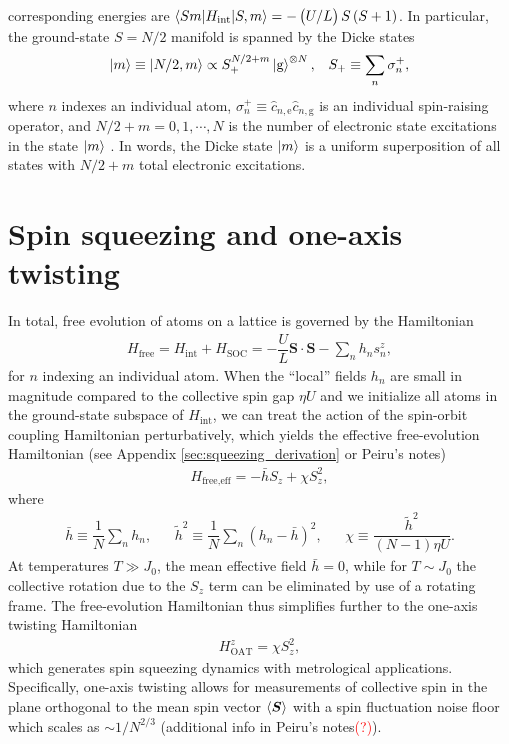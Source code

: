 \documentclass[aps,notitlepage,nofootinbib,11pt]{revtex4-1}
\renewcommand{\t}{\text} %
\newcommand{\f}[2]{\dfrac{#1}{#2}} %
\newcommand{\p}[1]{\left(#1\right)} %
\renewcommand{\v}{\bm} %
\renewcommand{\c}{\cdot} %
\newcommand{\bk}{\braket} %
\newcommand{\g}{\text{g}} %
\newcommand{\e}{\text{e}}
\newcommand{\1}{\mathds{1}}
\newcommand{\note}[1]{\textcolor{red}{#1}}
\begin{document}
corresponding energies are $\bk{Sm|H_{\t{int}}|S,m}=-\p{U/L}S\p{S+1}$.
In particular, the ground-state $S=N/2$ manifold is spanned by the
Dicke states
\begin{align}
  \ket{m} \equiv \ket{N/2,m} \propto S_+^{N/2+m} \ket{\g}^{\otimes N},
  &&
  S_+ \equiv \sum_n \sigma_n^+,
  \label{eq:dicke_states}
\end{align}
where $n$ indexes an individual atom,
$\sigma_n^+\equiv\hat c_{n,\e}\hat c_{n,\g}$ is an individual
spin-raising operator, and $N/2+m=0,1,\cdots,N$ is the number of
electronic state excitations in the state $\ket{m}$
\cite{swallows2011suppression}.  In words, the Dicke state $\ket{m}$
is a uniform superposition of all states with $N/2+m$ total electronic
excitations.


\section{Spin squeezing and one-axis twisting}
\label{sec:OAT}

In total, free evolution of atoms on a lattice is governed by the
Hamiltonian
\begin{align}
  H_{\t{free}}
  = H_{\t{int}} + H_{\t{SOC}}
  = -\f{U}{L} \v S\c\v S - \sum_n h_n s_n^z,
\end{align}
for $n$ indexing an individual atom.  When the ``local'' fields $h_n$
are small in magnitude compared to the collective spin gap $\eta U$
and we initialize all atoms in the ground-state subspace of
$H_{\t{int}}$, we can treat the action of the spin-orbit coupling
Hamiltonian perturbatively, which yields the effective free-evolution
Hamiltonian (see Appendix \ref{sec:squeezing_derivation} or Peiru's
notes)
\begin{align}
  H_{\t{free,eff}} = -\bar h S_z + \chi S_z^2,
\end{align}
where
\begin{align}
  \bar h \equiv \f1N \sum_n h_n,
  &&
  \tilde h^2 \equiv \f1N \sum_n \p{h_n - \bar h}^2,
  &&
  \chi \equiv \f{\tilde h^2}{\p{N-1}\eta U}.
\end{align}
At temperatures $T\gg J_0$, the mean effective field $\bar h=0$, while
for $T\sim J_0$ the collective rotation due to the $S_z$ term can be
eliminated by use of a rotating frame.  The free-evolution Hamiltonian
thus simplifies further to the one-axis twisting Hamiltonian
\begin{align}
  H_{\t{OAT}}^z = \chi S_z^2,
  \label{eq:H_OAT}
\end{align}
which generates spin squeezing dynamics with metrological
applications.  Specifically, one-axis twisting allows for measurements
of collective spin in the plane orthogonal to the mean spin vector
$\bk{\v S}$ with a spin fluctuation noise floor which scales as
$\sim1/N^{2/3}$ (additional info in Peiru's notes\note{(?)}).
\end{document}
